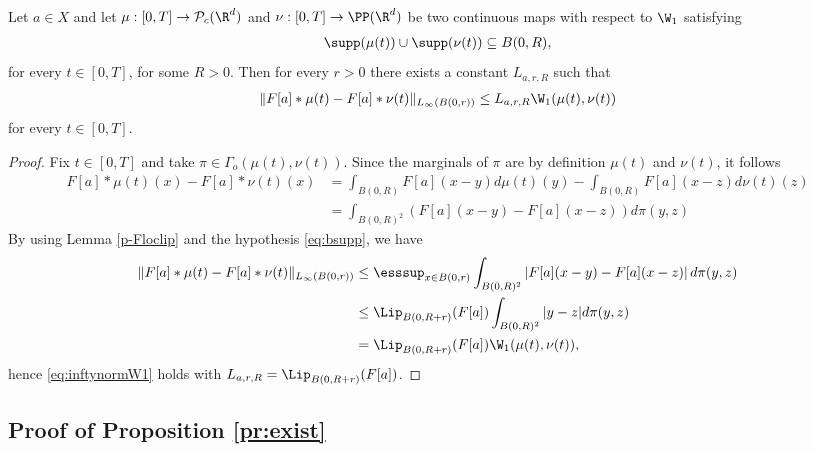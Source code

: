 \begin{lemma}\label{p-lipkernel}
Let $a \in X$ and let $\mu:[0,T] \rightarrow \mathcal{P}_c(\R^d)$ and $\nu: [0,T] \to \PP(\R^d)$ be two continuous maps with respect to $\W_1$ satisfying
\begin{align}\label{eq:bsupp}
\supp(\mu(t)) \cup \supp(\nu(t)) \subseteq B(0,R),
\end{align}
for every $t \in [0,T]$, for some $R > 0$. Then for every $r > 0$ there exists a constant $L_{a,r,R}$ such that
\begin{align}\label{eq:inftynormW1}
\|F[a] * \mu(t) - F[a] * \nu(t)\|_{L_{\infty}(B(0,r))} \leq L_{a,r,R} \W_1(\mu(t),\nu(t))
\end{align}
for every $t \in [0,T]$.
\end{lemma}
\begin{proof}
Fix $t \in [0,T]$ and take $\pi \in \Gamma_o(\mu(t),\nu(t))$. Since the marginals of $\pi$ are by definition $\mu(t)$ and $\nu(t)$, it follows
\begin{align*}
F[a] * \mu(t)(x) - F[a] * \nu(t)(x) &= \int_{B(0,R)} F[a](x-y) d\mu(t)(y) - \int_{B(0,R)} F[a](x-z) d\nu(t)(z)  \\
&= \int_{B(0,R)^2} \left(F[a](x-y) - F[a](x-z)\right) d\pi(y,z)
\end{align*}
By using Lemma \ref{p-Floclip} and the hypothesis \eqref{eq:bsupp}, we have
\begin{align*}
\|F[a] * \mu(t) - F[a] * \nu(t)\|_{L_{\infty}(B(0,r))} &\leq \esssup_{x \in B(0,r)} \int_{B(0,R)^2} \left|F[a](x-y) - F[a](x-z)\right| d\pi(y,z) \\
&\leq \Lip_{B(0,R+r)}(F[a]) \int_{B(0,R)^2} |y - z| d\pi(y,z) \\
&= \Lip_{B(0,R+r)}(F[a]) \W_1(\mu(t),\nu(t)),
\end{align*}
hence \eqref{eq:inftynormW1} holds with $L_{a,r,R} = \Lip_{B(0,R+r)}(F[a])$.
\end{proof}


\subsection{Proof of Proposition \ref{pr:exist}}\label{ap2}

